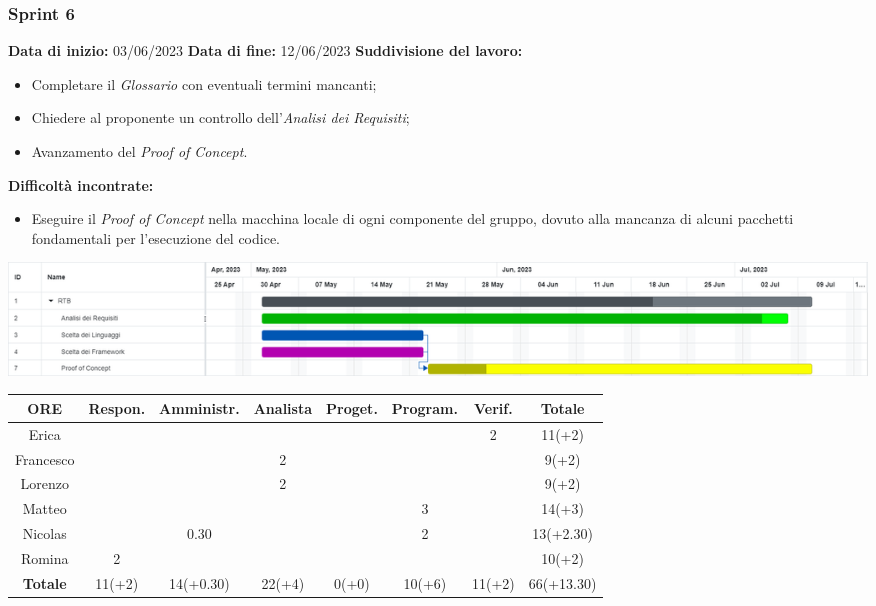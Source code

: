 \documentclass[a4paper, 12pt]{article}
\begin{document}
\subsubsection{Sprint 6}
\textbf{Data di inizio:} 03/06/2023\newline
\textbf{Data di fine:} 12/06/2023\newline
\newline
\textbf{Suddivisione del lavoro:}
\begin{itemize}
    \item Completare il \textit{Glossario} con eventuali termini mancanti;
    \item Chiedere al proponente un controllo dell'\textit{Analisi dei Requisiti};
    \item Avanzamento del \textit{Proof of Concept}.
\end{itemize}
\textbf{Difficoltà incontrate:}
\begin{itemize}
    \item Eseguire il \textit{Proof of Concept} nella macchina locale di ogni componente del gruppo, dovuto alla mancanza di alcuni pacchetti fondamentali per l'esecuzione del codice.
\end{itemize}
\includegraphics[scale=0.24]{RTB_5.png}\newline
\newline
\begin{tabular}{|c|c|c|c|c|c|c|c|}
    \hline
    \textbf{ORE} & \textbf{Respon.} & \textbf{Amministr.} & \textbf{Analista} & \textbf{Proget.} & \textbf{Program.} & \textbf{Verif.} & \textbf{Totale}\\
    \hline
    Erica & & & & & & 2 & 11(+2)\\
    \hline
    Francesco & & & 2 & & & & 9(+2)\\
    \hline
    Lorenzo & & & 2 & & & & 9(+2)\\
    \hline
    Matteo & & & & & 3 & & 14(+3)\\
    \hline
    Nicolas & & 0.30 & & & 2 & & 13(+2.30)\\
    \hline
    Romina & 2 & & & & & & 10(+2)\\
    \hline
    \textbf{Totale} & 11(+2) & 14(+0.30) & 22(+4) & 0(+0) & 10(+6) & 11(+2) & 66(+13.30)\\
    \hline
\end{tabular}\\[8pt]
\end{document}
